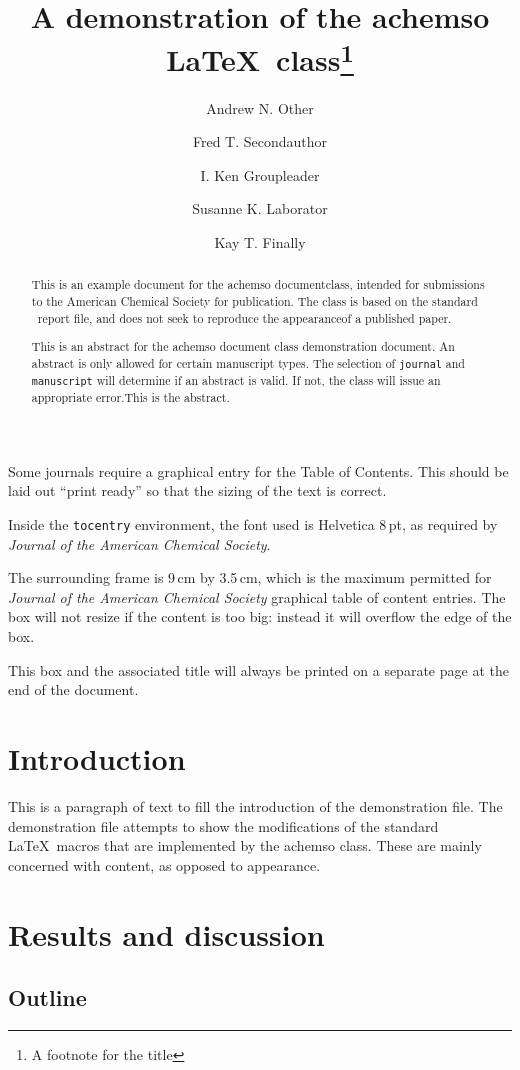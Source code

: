 \documentclass[journal=jacsat,manuscript=article]{achemso}
\author{Andrew N. Other}
\author{Fred T. Secondauthor}
\author{I. Ken Groupleader}
\affiliation{Department of Chemistry, Unknown University, Unknown Town}
\author{Susanne K. Laborator}
\affiliation{Lead Discovery, BigPharma, Big Town, USA}
\author{Kay T. Finally}
\affiliation{Department of Chemistry, Unknown University, Unknown Town}
\title[An \textsf{achemso} demo]{A demonstration of the \textsf{achemso}
\LaTeX~class\footnote{A footnote for the title}}
\begin{document}
\begin{abstract}
This is an example document for the \textsf{achemso} documentclass,
intended for submissions to the American Chemical Society for
publication. The class is based on the standard \LaTeXe~\textsf{report}
file, and does not seek to reproduce the appearanceof a published paper.

This is an abstract for the \textsf{achemso} document class
demonstration document. An abstract is only allowed for certain
manuscript types. The selection of \texttt{journal} and
\texttt{manuscript} will determine if an abstract is valid. If not, the
class will issue an appropriate error.This is the abstract.
\end{abstract}
\begin{tocentry}
Some journals require a graphical entry for the Table of Contents.
This should be laid out ``print ready'' so that the sizing of the
text is correct.

Inside the \texttt{tocentry} environment, the font used is Helvetica
8\,pt, as required by \emph{Journal of the American Chemical
Society}.

The surrounding frame is 9\,cm by 3.5\,cm, which is the maximum
permitted for  \emph{Journal of the American Chemical Society}
graphical table of content entries. The box will not resize if the
content is too big: instead it will overflow the edge of the box.

This box and the associated title will always be printed on a
separate page at the end of the document.
\end{tocentry}

\section{Introduction}\label{introduction}

This is a paragraph of text to fill the introduction of the
demonstration file. The demonstration file attempts to show the
modifications of the standard \LaTeX~macros that are implemented by the
\textsf{achemso} class. These are mainly concerned with content, as
opposed to appearance.

\section{Results and discussion}\label{results-and-discussion}

\subsection{Outline}\label{outline}
\end{document}
